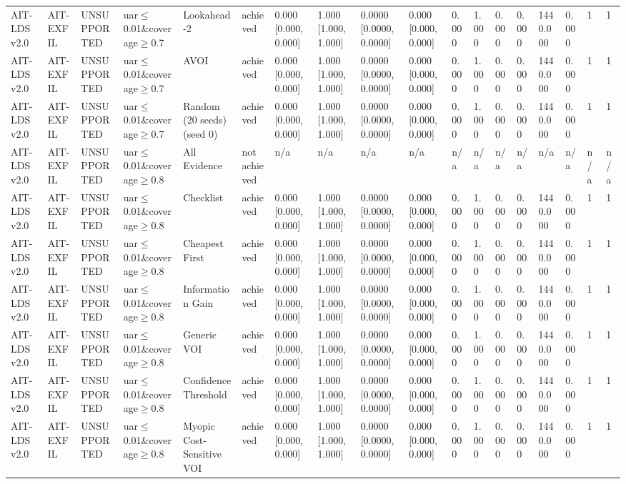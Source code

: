 \begin{table}[!ht]
{\begin{tabular}{llllllllllllllllll}
AIT-LDS v2.0 & AIT-EXFIL & UNSUPPORTED & uar$\le$0.01\&coverage$\ge$0.7 & Lookahead-2 & achieved & 0.000 [0.000, 0.000] & 1.000 [1.000, 1.000] & 0.0000 [0.0000, 0.0000] & 0.000 [0.000, 0.000] & 0.000 & 1.000 & 0.000 & 0.000 & 1440.000 & 0.000 & 1 & 1 \\
AIT-LDS v2.0 & AIT-EXFIL & UNSUPPORTED & uar$\le$0.01\&coverage$\ge$0.7 & AVOI & achieved & 0.000 [0.000, 0.000] & 1.000 [1.000, 1.000] & 0.0000 [0.0000, 0.0000] & 0.000 [0.000, 0.000] & 0.000 & 1.000 & 0.000 & 0.000 & 1440.000 & 0.000 & 1 & 1 \\
AIT-LDS v2.0 & AIT-EXFIL & UNSUPPORTED & uar$\le$0.01\&coverage$\ge$0.7 & Random (20 seeds) (seed 0) & achieved & 0.000 [0.000, 0.000] & 1.000 [1.000, 1.000] & 0.0000 [0.0000, 0.0000] & 0.000 [0.000, 0.000] & 0.000 & 1.000 & 0.000 & 0.000 & 1440.000 & 0.000 & 1 & 1 \\
AIT-LDS v2.0 & AIT-EXFIL & UNSUPPORTED & uar$\le$0.01\&coverage$\ge$0.8 & All Evidence & not achieved & n/a & n/a & n/a & n/a & n/a & n/a & n/a & n/a & n/a & n/a & n/a & n/a \\
AIT-LDS v2.0 & AIT-EXFIL & UNSUPPORTED & uar$\le$0.01\&coverage$\ge$0.8 & Checklist & achieved & 0.000 [0.000, 0.000] & 1.000 [1.000, 1.000] & 0.0000 [0.0000, 0.0000] & 0.000 [0.000, 0.000] & 0.000 & 1.000 & 0.000 & 0.000 & 1440.000 & 0.000 & 1 & 1 \\
AIT-LDS v2.0 & AIT-EXFIL & UNSUPPORTED & uar$\le$0.01\&coverage$\ge$0.8 & Cheapest First & achieved & 0.000 [0.000, 0.000] & 1.000 [1.000, 1.000] & 0.0000 [0.0000, 0.0000] & 0.000 [0.000, 0.000] & 0.000 & 1.000 & 0.000 & 0.000 & 1440.000 & 0.000 & 1 & 1 \\
AIT-LDS v2.0 & AIT-EXFIL & UNSUPPORTED & uar$\le$0.01\&coverage$\ge$0.8 & Information Gain & achieved & 0.000 [0.000, 0.000] & 1.000 [1.000, 1.000] & 0.0000 [0.0000, 0.0000] & 0.000 [0.000, 0.000] & 0.000 & 1.000 & 0.000 & 0.000 & 1440.000 & 0.000 & 1 & 1 \\
AIT-LDS v2.0 & AIT-EXFIL & UNSUPPORTED & uar$\le$0.01\&coverage$\ge$0.8 & Generic VOI & achieved & 0.000 [0.000, 0.000] & 1.000 [1.000, 1.000] & 0.0000 [0.0000, 0.0000] & 0.000 [0.000, 0.000] & 0.000 & 1.000 & 0.000 & 0.000 & 1440.000 & 0.000 & 1 & 1 \\
AIT-LDS v2.0 & AIT-EXFIL & UNSUPPORTED & uar$\le$0.01\&coverage$\ge$0.8 & Confidence Threshold & achieved & 0.000 [0.000, 0.000] & 1.000 [1.000, 1.000] & 0.0000 [0.0000, 0.0000] & 0.000 [0.000, 0.000] & 0.000 & 1.000 & 0.000 & 0.000 & 1440.000 & 0.000 & 1 & 1 \\
AIT-LDS v2.0 & AIT-EXFIL & UNSUPPORTED & uar$\le$0.01\&coverage$\ge$0.8 & Myopic Cost-Sensitive VOI & achieved & 0.000 [0.000, 0.000] & 1.000 [1.000, 1.000] & 0.0000 [0.0000, 0.0000] & 0.000 [0.000, 0.000] & 0.000 & 1.000 & 0.000 & 0.000 & 1440.000 & 0.000 & 1 & 1 \\

\end{tabular}}
\end{table}
